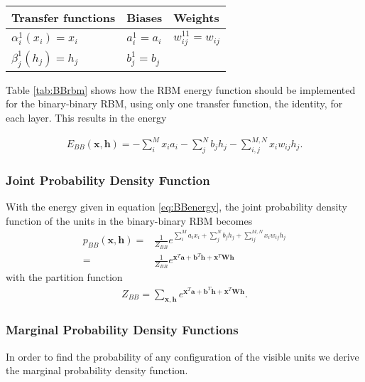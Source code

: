 \documentclass[twoside,english]{uiofysmaster}
\newcommand{\ra}[1]{\renewcommand{\arraystretch}{#1}}
\begin{document}
\begin{table*}\centering
\ra{1.3}
\caption{This table shows how the terms in the restricted Boltzmann machine (RBM) energy function (equation \ref{eq:RBMenergy}) should be implemented in order to yield the binary-binary restricted boltzmann machine, that is an RBM where both visible and hidden units take binary values. }
\label{tab:BBrbm}
\begin{tabular}{lll}
\toprule
\toprule
Transfer functions & Biases & Weights \\ 
\midrule 
$\alpha_i^1 (x_i) = x_i$ & $a_i^1 = a_i$  & $w_{ij}^{11} = w_{ij}$ \\
$\beta_j^1 (h_j) = h_j$  & $b_j^1 = b_j$  &  \\
\bottomrule
\bottomrule
\end{tabular}
\end{table*}

Table \ref{tab:BBrbm} shows how the RBM energy function should be implemented for the binary-binary RBM, using only one transfer function, the identity, for each layer. This results in the energy

\begin{align}
	E_{BB}(\bm{x}, \mathbf{h}) = - \sum_i^M x_i a_i- \sum_j^N b_j h_j - \sum_{i,j}^{M,N} x_i w_{ij} h_j.
	\label{eq:BBenergy}
\end{align}


\subsubsection{Joint Probability Density Function}
With the energy given in equation \ref{eq:BBenergy}, the joint probability density function of the units in the binary-binary RBM becomes
\begin{align}
	p_{BB}(\bm{x}, \bm{h}) =& \frac{1}{Z_{BB}} e^{\sum_i^M a_i x_i + \sum_j^N b_j h_j + \sum_{ij}^{M,N} x_i w_{ij} h_j} \\
	=& \frac{1}{Z_{BB}} e^{\bm{x}^T \bm{a} + \bm{b}^T \bm{h} + \bm{x}^T \bm{W} \bm{h}}
\end{align}
with the partition function
\begin{align}
	Z_{BB} = \sum_{\bm{x}, \bm{h}} e^{\bm{x}^T \bm{a} + \bm{b}^T \bm{h} + \bm{x}^T \bm{W} \bm{h}} .
\end{align}

\subsubsection{Marginal Probability Density Functions}
In order to find the probability of any configuration of the visible units we derive the marginal probability density function.
\end{document}
